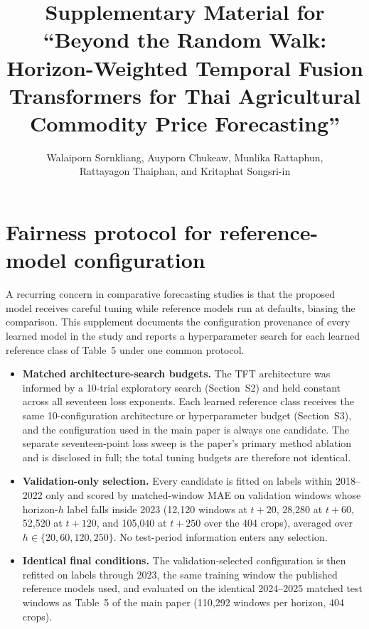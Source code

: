 \documentclass[11pt]{article}
\title{Supplementary Material for ``Beyond the Random Walk: Horizon-Weighted Temporal Fusion Transformers for Thai Agricultural Commodity Price Forecasting''}
\author{Walaiporn Sornkliang, Auyporn Chukeaw, Munlika Rattaphun,\\
Rattayagon Thaiphan, and Kritaphat Songsri-in}
\date{}
\begin{document}
\maketitle

\section{Fairness protocol for reference-model configuration}
A recurring concern in comparative forecasting studies is that the proposed model receives careful tuning while reference models run at defaults, biasing the comparison. This supplement documents the configuration provenance of every learned model in the study and reports a hyperparameter search for each learned reference class of Table~5 under one common protocol.

\begin{itemize}
\item \textbf{Matched architecture-search budgets.} The TFT architecture was informed by a 10-trial exploratory search (Section~S2) and held constant across all seventeen loss exponents. Each learned reference class receives the same 10-configuration architecture or hyperparameter budget (Section~S3), and the configuration used in the main paper is always one candidate. The separate seventeen-point loss sweep is the paper's primary method ablation and is disclosed in full; the total tuning budgets are therefore not identical.
\item \textbf{Validation-only selection.} Every candidate is fitted on labels within 2018--2022 only and scored by matched-window MAE on validation windows whose horizon-$h$ label falls inside 2023 (12{,}120 windows at $t{+}20$, 28{,}280 at $t{+}60$, 52{,}520 at $t{+}120$, and 105{,}040 at $t{+}250$ over the 404 crops), averaged over $h \in \{20, 60, 120, 250\}$. No test-period information enters any selection.
\item \textbf{Identical final conditions.} The validation-selected configuration is then refitted on labels through 2023, the same training window the published reference models used, and evaluated on the identical 2024--2025 matched test windows as Table~5 of the main paper (110{,}292 windows per horizon, 404 crops).
\end{itemize}
\end{document}
